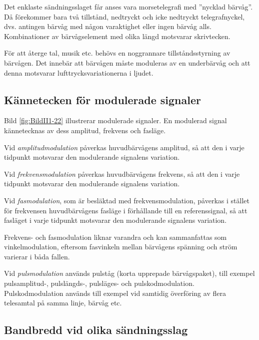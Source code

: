 Det enklaste sändningsslaget får anses vara morsetelegrafi med
''nycklad bärvåg''.
Då förekommer bara två tillstånd, nedtryckt och icke nedtryckt telegrafnyckel,
dvs. antingen bärvåg med någon varaktighet eller ingen bärvåg alls.
Kombinationer av bärvågselement med olika längd motsvarar skrivtecken.

För att återge tal, musik etc. behövs en noggrannare tillståndsstyrning av
bärvågen.
Det innebär att bärvågen måste moduleras av en underbärvåg och att denna
motsvarar lufttrycksvariationerna i ljudet.

\subsection{Kännetecken för modulerade signaler}
\label{kännetecken_modulerade_signaler}


Bild \ref{fig:BildII1-22} illustrerar modulerade signaler.
En modulerad signal kännetecknas av dess amplitud, frekvens och fasläge.

Vid \emph{amplitudmodulation} påverkas huvudbärvågens amplitud, så att den i
varje tidpunkt motsvarar den modulerande signalens variation.

Vid \emph{frekvensmodulation} påverkas huvudbärvågens frekvens, så att den i
varje tidpunkt motsvarar den modulerande signalens variation.

Vid \emph{fasmodulation}, som är besläktad med frekvensmodulation, påverkas i
stället för frekvensen huvudbärvågens fasläge i förhållande till en
referenssignal, så att fasläget i varje tidpunkt motsvarar den modulerande
signalens variation.

Frekvens- och fasmodulation liknar varandra och kan sammanfattas som
vinkelmodulation, eftersom fasvinkeln mellan bärvågens spänning och ström
varierar i båda fallen.

Vid \emph{pulsmodulation} används pulståg (korta upprepade bärvågspaket), till exempel
pulsamplitud-, pulslängds-, pulsläges- och pulskodmodulation.
Pulskodmodulation används till exempel vid samtidig överföring av flera telesamtal på
samma linje, bärvåg etc.


\subsection{Bandbredd vid olika sändningsslag}
\label{bandbredd_modulation}

